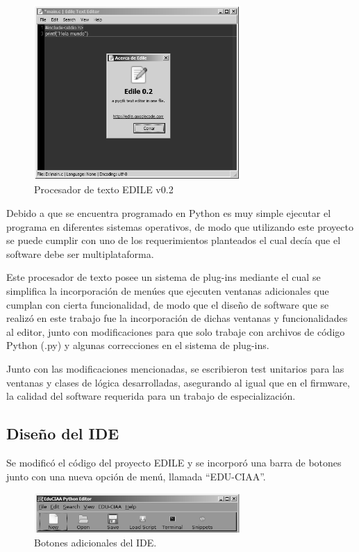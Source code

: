 \begin{figure}[ht]
  \centering
    \includegraphics[width=0.7\textwidth]{Figures/fig_edile}
  \caption{Procesador de texto EDILE v0.2}
  \label{fig:edile}
\end{figure}

Debido a que se encuentra programado en Python es muy simple ejecutar el programa en diferentes sistemas operativos, de modo que utilizando este proyecto se puede cumplir con uno de los requerimientos planteados el cual decía que el software debe ser multiplataforma.

Este procesador de texto posee un sistema de plug-ins mediante el cual se simplifica la incorporación de menúes que ejecuten ventanas adicionales que cumplan con cierta funcionalidad, de modo que el diseño de software que se realizó en este trabajo fue la incorporación de dichas ventanas y funcionalidades al editor, junto con modificaciones para que solo trabaje con archivos de código Python (.py) y algunas correcciones en el sistema de plug-ins.

Junto con las modificaciones mencionadas, se escribieron test unitarios para las ventanas y clases de lógica desarrolladas, asegurando al igual que en el firmware, la calidad del software requerida para un trabajo de especialización.

\subsection{Diseño del IDE} 

Se modificó el código del proyecto EDILE y se incorporó una barra de botones junto con una nueva opción de menú, llamada “EDU-CIAA”.

\begin{figure}[ht]
  \centering
    \includegraphics[width=0.7\textwidth]{Figures/fig_ide_buttons}
  \caption{Botones adicionales del IDE.}
  \label{fig:idebuttons}
\end{figure}

